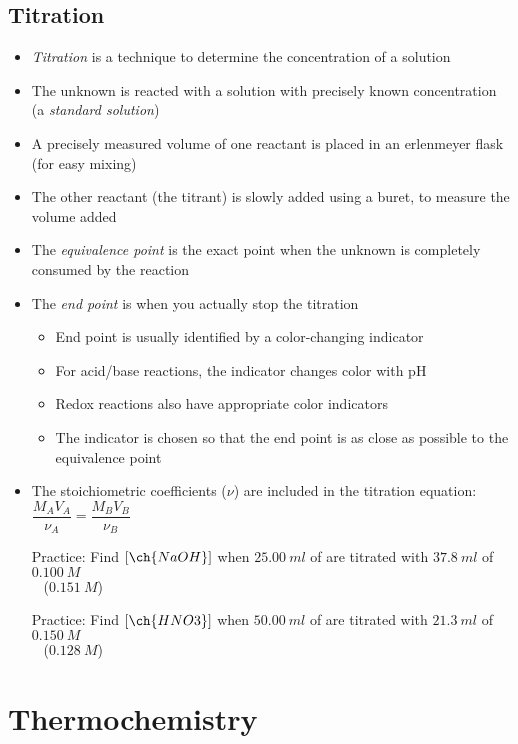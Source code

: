 \documentclass[12pt, openany, letterpaper]{memoir}
\begin{document}
\section{Titration}
\begin{itemize}
	\item \emph{Titration} is a technique to determine the concentration of a solution
	\item The unknown is reacted with a solution with precisely known concentration (a \emph{standard solution})
	\item A precisely measured volume of one reactant is placed in an erlenmeyer flask (for easy mixing)
	\item The other reactant (the titrant) is slowly added using a buret, to measure the volume added
	\item The \emph{equivalence point} is the exact point when the unknown is completely consumed by the reaction
	\item The \emph{end point} is when you actually stop the titration
	      \begin{itemize}
		      \item End point is usually identified by a color-changing indicator
		      \item For acid/base reactions, the indicator changes color with pH
		      \item Redox reactions also have appropriate color indicators
		      \item The indicator is chosen so that the end point is as close as possible to the equivalence point
	      \end{itemize}
	\item The stoichiometric coefficients ($\nu$) are included in the titration equation: $\dfrac{M_AV_A}{\nu_A}=\dfrac{M_BV_B}{\nu_B}$

	      Practice: Find $\left[\ch{NaOH}\right]$ when $25.00~ml$ of  are titrated with $37.8~ml$ of $0.100~M$ \\
	      ~\hphantom{Practice: } ($0.151~M$)

	      Practice: Find $\left[\ch{HNO3}\right]$ when $50.00~ml$ of  are titrated with $21.3~ml$ of $0.150~M$ \\
	      ~\hphantom{Practice: } ($0.128~M$)
\end{itemize}

\chapter{Thermochemistry}
\end{document}
